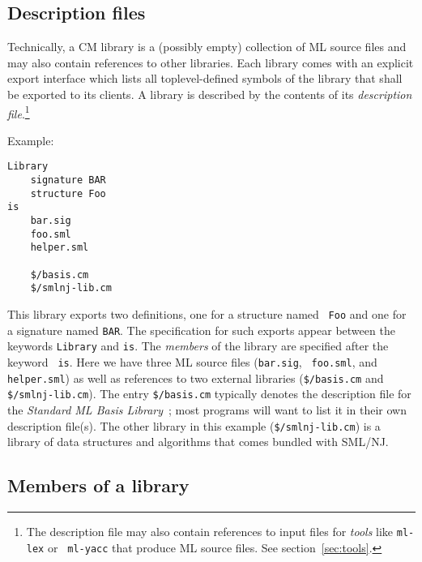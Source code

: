 \documentclass[titlepage,letterpaper]{article}
\begin{document}
\subsection{Description files}

Technically, a CM library is a (possibly empty) collection of ML
source files and may also contain references to other libraries.  Each
library comes with an explicit export interface which lists all
toplevel-defined symbols of the library that shall be exported to its
clients.  A library is described by the contents of its {\em
description file}.\footnote{The description file may also contain
references to input files for {\em tools} like {\tt ml-lex} or {\tt
ml-yacc} that produce ML source files.  See section~\ref{sec:tools}.}

\noindent Example:

\begin{verbatim}
Library
    signature BAR
    structure Foo
is
    bar.sig
    foo.sml
    helper.sml

    $/basis.cm
    $/smlnj-lib.cm
\end{verbatim}

This library exports two definitions, one for a structure named {\tt
Foo} and one for a signature named {\tt BAR}.  The specification for
such exports appear between the keywords {\tt Library} and {\tt is}.
The {\em members} of the library are specified after the keyword {\tt
is}.  Here we have three ML source files ({\tt bar.sig}, {\tt
foo.sml}, and {\tt helper.sml}) as well as references to two external
libraries ({\tt \$/basis.cm} and {\tt \$/smlnj-lib.cm}).  The entry
{\tt \$/basis.cm} typically denotes the description file for the {\it
Standard ML Basis Library}~\cite{reppy99:basis}; most programs will
want to list it in their own description file(s).  The other library
in this example ({\tt \$/smlnj-lib.cm}) is a library of data
structures and algorithms that comes bundled with SML/NJ.

\subsection{Members of a library}
\end{document}
